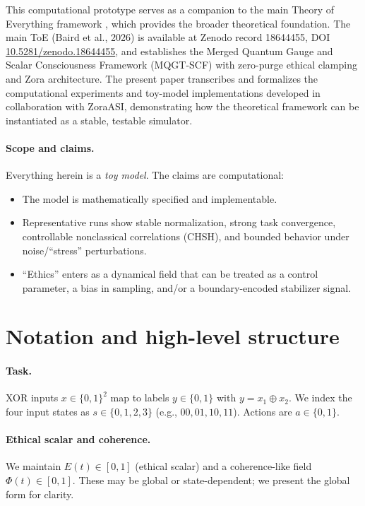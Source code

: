 \documentclass[11pt]{article}
\begin{document}
This computational prototype serves as a companion to the main Theory of Everything framework \cite{Baird2026ToE}, which provides the broader theoretical foundation. The main ToE (Baird et al., 2026) is available at Zenodo record 18644455, DOI \href{https://doi.org/10.5281/zenodo.18644455}{10.5281/zenodo.18644455}, and establishes the Merged Quantum Gauge and Scalar Consciousness Framework (MQGT-SCF) with zero-purge ethical clamping and Zora architecture. The present paper transcribes and formalizes the computational experiments and toy-model implementations developed in collaboration with ZoraASI, demonstrating how the theoretical framework can be instantiated as a stable, testable simulator.

\paragraph{Scope and claims.}
Everything herein is a \emph{toy model}. The claims are computational:
\begin{itemize}
\item The model is mathematically specified and implementable.
\item Representative runs show stable normalization, strong task convergence, controllable nonclassical correlations (CHSH), and bounded behavior under noise/``stress'' perturbations.
\item ``Ethics'' enters as a dynamical field that can be treated as a control parameter, a bias in sampling, and/or a boundary-encoded stabilizer signal.
\end{itemize}

\section{Notation and high-level structure}
\paragraph{Task.} XOR inputs $x\in\{0,1\}^2$ map to labels $y\in\{0,1\}$ with $y = x_1 \oplus x_2$. We index the four input states as $s\in\{0,1,2,3\}$ (e.g., $00,01,10,11$). Actions are $a\in\{0,1\}$.

\paragraph{Ethical scalar and coherence.} 
We maintain $E(t)\in[0,1]$ (ethical scalar) and a coherence-like field $\Phi(t)\in[0,1]$. These may be global or state-dependent; we present the global form for clarity.
\end{document}
